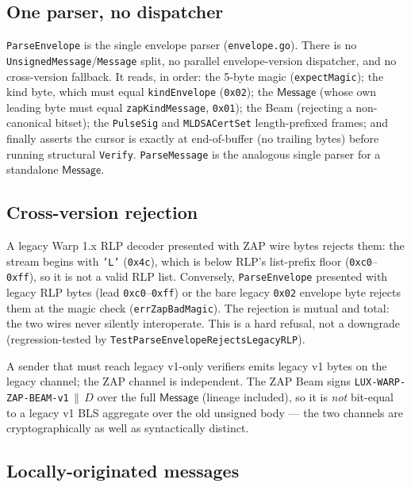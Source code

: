 \subsection{One parser, no dispatcher}

\texttt{ParseEnvelope} is the single envelope parser (\texttt{envelope.go}). There is no \texttt{UnsignedMessage}/\texttt{Message} split, no parallel envelope-version dispatcher, and no cross-version fallback. It reads, in order: the 5-byte magic (\texttt{expectMagic}); the kind byte, which must equal \texttt{kindEnvelope} (\texttt{0x02}); the $\mathsf{Message}$ (whose own leading byte must equal \texttt{zapKindMessage}, \texttt{0x01}); the Beam (rejecting a non-canonical bitset); the \texttt{PulseSig} and \texttt{MLDSACertSet} length-prefixed frames; and finally asserts the cursor is exactly at end-of-buffer (no trailing bytes) before running structural \texttt{Verify}. \texttt{ParseMessage} is the analogous single parser for a standalone $\mathsf{Message}$.

\subsection{Cross-version rejection}

A legacy Warp 1.x RLP decoder presented with ZAP wire bytes rejects them: the stream begins with \texttt{'L'} (\texttt{0x4c}), which is below RLP's list-prefix floor (\texttt{0xc0}--\texttt{0xff}), so it is not a valid RLP list. Conversely, \texttt{ParseEnvelope} presented with legacy RLP bytes (lead \texttt{0xc0}--\texttt{0xff}) or the bare legacy \texttt{0x02} envelope byte rejects them at the magic check (\texttt{errZapBadMagic}). The rejection is mutual and total: the two wires never silently interoperate. This is a hard refusal, not a downgrade (regression-tested by \texttt{TestParseEnvelopeRejectsLegacyRLP}).

A sender that must reach legacy v1-only verifiers emits legacy v1 bytes on the legacy channel; the ZAP channel is independent. The ZAP Beam signs \texttt{LUX-WARP-ZAP-BEAM-v1}$\,\|\,D$ over the full $\mathsf{Message}$ (lineage included), so it is \emph{not} bit-equal to a legacy v1 BLS aggregate over the old unsigned body --- the two channels are cryptographically as well as syntactically distinct.

\subsection{Locally-originated messages}

